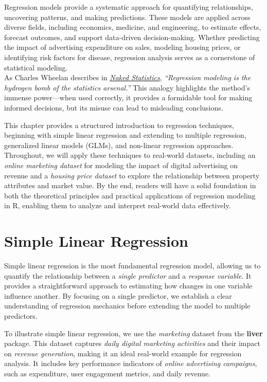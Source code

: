 \documentclass[
]{book}
\theoremstyle{definition}
\theoremstyle{definition}
\theoremstyle{definition}
\theoremstyle{definition}
\theoremstyle{remark}
\begin{document}
Regression models provide a systematic approach for quantifying relationships, uncovering patterns, and making predictions. These models are applied across diverse fields, including economics, medicine, and engineering, to estimate effects, forecast outcomes, and support data-driven decision-making. Whether predicting the impact of advertising expenditure on sales, modeling housing prices, or identifying risk factors for disease, regression analysis serves as a cornerstone of statistical modeling.\\
As Charles Wheelan describes in \href{https://www.goodreads.com/book/show/15786586-naked-statistics}{\emph{Naked Statistics}}\citep{wheelan2013naked}, \emph{``Regression modeling is the hydrogen bomb of the statistics arsenal.''} This analogy highlights the method's immense power---when used correctly, it provides a formidable tool for making informed decisions, but its misuse can lead to misleading conclusions.

This chapter provides a structured introduction to regression techniques, beginning with simple linear regression and extending to multiple regression, generalized linear models (GLMs), and non-linear regression approaches. Throughout, we will apply these techniques to real-world datasets, including an \emph{online marketing dataset} for modeling the impact of digital advertising on revenue and a \emph{housing price dataset} to explore the relationship between property attributes and market value. By the end, readers will have a solid foundation in both the theoretical principles and practical applications of regression modeling in R, enabling them to analyze and interpret real-world data effectively.

\section{Simple Linear Regression}\label{sec-simple-regression}

Simple linear regression is the most fundamental regression model, allowing us to quantify the relationship between a \emph{single predictor} and a \emph{response variable}. It provides a straightforward approach to estimating how changes in one variable influence another. By focusing on a single predictor, we establish a clear understanding of regression mechanics before extending the model to multiple predictors.

To illustrate simple linear regression, we use the \emph{marketing} dataset from the \textbf{liver} package. This dataset captures \emph{daily digital marketing activities} and their impact on \emph{revenue generation}, making it an ideal real-world example for regression analysis. It includes key performance indicators of \emph{online advertising campaigns}, such as expenditure, user engagement metrics, and daily revenue.
\end{document}
